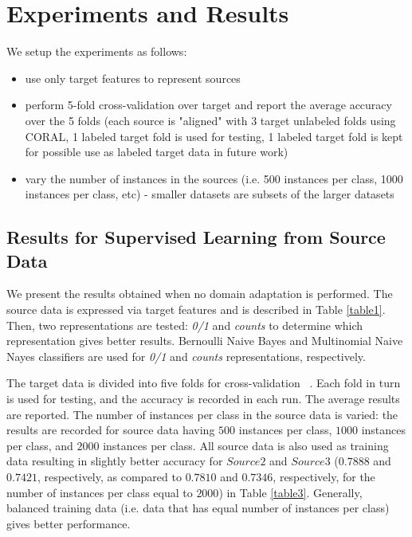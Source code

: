 \section{Experiments and Results}
\label{coralexperiments}

We setup the experiments as follows:

\begin{itemize}
  \item use only target features to represent sources
  \item perform 5-fold cross-validation over target and report the average accuracy over the 5 folds (each source is "aligned" with 3 target unlabeled folds using CORAL, 1 labeled target fold is used for testing, 1 labeled target fold is kept for possible use as labeled target data in future work)
  \item vary the number of instances in the sources (i.e. 500 instances per class, 1000 instances per class, etc) - smaller datasets are subsets of the larger datasets
\end{itemize}


\subsection{Results for Supervised Learning from Source Data}
\label{preresults}

We present the results obtained when no domain adaptation is performed. The source data is expressed via target features and is described in Table \ref{table1}. Then, two representations are tested: \textit{0/1} and \textit{counts} to determine which representation gives better results. Bernoulli Naive Bayes and Multinomial Naive Nayes classifiers are used for \textit{0/1} and \textit{counts} representations, respectively. 

The target data is divided into five folds for cross-validation ~\citep{hastie}. Each fold in turn is used for testing, and the accuracy is recorded in each run. The average results are reported. The number of instances per class in the source data is varied: the results are recorded for source data having $500$ instances per class, $1000$ instances per class, and $2000$ instances per class. All source data is also used as training data resulting in slightly better accuracy for $Source 2$ and $Source  3$ ($0.7888$ and $0.7421$, respectively, as compared to $0.7810$ and $0.7346$, respectively, for the number of instances per class equal to $2000$) in Table \ref{table3}. Generally, balanced training data (i.e. data that has equal number of instances per class) gives better performance.

